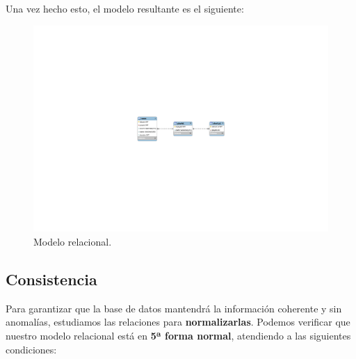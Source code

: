 Una vez hecho esto, el modelo resultante es el siguiente:

\smallskip

\begin{figure}[H]
	\noindent \begin{centering}
		\includegraphics[width=\linewidth]{capitulo4/bd_rel}
		\par\end{centering}
	\smallskip
	\caption{\label{fig:bd_rel} Modelo relacional.}
\end{figure} 

\smallskip

\subsection{Consistencia}

Para garantizar que la base de datos mantendrá la información coherente y sin anomalías, estudiamos las relaciones para \textbf{normalizarlas}. Podemos verificar que nuestro modelo relacional está en \textbf{5ª forma normal}, atendiendo a las siguientes condiciones:

